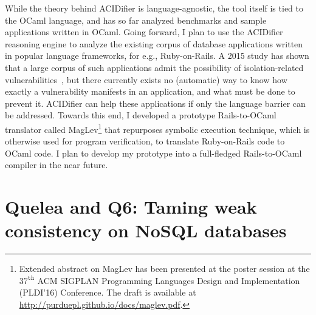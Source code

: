 While the theory behind {\sc ACIDifier} is language-agnostic, the tool
itself is tied to the OCaml language, and has so far analyzed
benchmarks and sample applications written in OCaml. Going forward, I
plan to use the {\sc ACIDifier} reasoning engine to analyze the
existing corpus of database applications written in popular language
frameworks, for e.g., Ruby-on-Rails. A 2015 study has shown that a
large corpus of such applications admit the possibility of
isolation-related vulnerabilities~\cite{bailisferal}, but there
currently exists no (automatic) way to know how exactly a
vulnerability manifests in an application, and what must be done to
prevent it. {\sc ACIDifier} can help these applications if only the
language barrier can be addressed. Towards this end, I developed a
prototype Rails-to-OCaml translator called {\sc
MagLev}\footnote{Extended abstract on {\sc MagLev} has been presented
at the poster session at the $37^{\texttt{th}}$ ACM SIGPLAN
Programming Languages Design and Implementation (PLDI'16) Conference.
The draft is available at \url{http://purduepl.github.io/docs/maglev.pdf}.}
that repurposes symbolic execution technique, which is otherwise used
for program verification, to translate Ruby-on-Rails code to OCaml
code. I plan to develop my prototype into a full-fledged
Rails-to-OCaml compiler in the near future.

\section*{{\sc Quelea} and {\sc Q6}: Taming weak consistency on NoSQL
databases}

